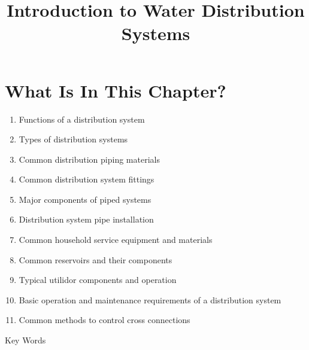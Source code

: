 \documentclass[10pt]{article}
\title{Introduction to Water Distribution Systems }
\author{}
\date{}
\begin{document}
\maketitle
\section{What Is In This Chapter?}
\begin{enumerate}
  \item Functions of a distribution system

  \item Types of distribution systems

  \item Common distribution piping materials

  \item Common distribution system fittings

  \item Major components of piped systems

  \item Distribution system pipe installation

  \item Common household service equipment and materials

  \item Common reservoirs and their components

  \item Typical utilidor components and operation

  \item Basic operation and maintenance requirements of a distribution system

  \item Common methods to control cross connections

\end{enumerate}
Key Words
\end{document}
